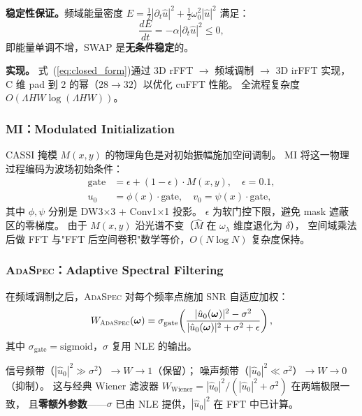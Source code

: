 \documentclass[a4paper,11pt,twocolumn]{ctexart}
\newcommand{\swap}{\textsc{SWAP}}
\newcommand{\mi}{\textsc{MI}}
\newcommand{\adaspec}{\textsc{AdaSpec}}
\newcommand{\nle}{\textsc{NLE}}
\begin{document}
\textbf{稳定性保证。}频域能量密度 $E = \frac{1}{2}|\partial_t\hat{u}|^2 + \frac{1}{2}\omega_0^2|\hat{u}|^2$ 满足：
\begin{equation}
\frac{dE}{dt} = -\alpha |\partial_t \hat{u}|^2 \le 0,
\label{eq:stability}
\end{equation}
即能量单调不增，\swap{} 是\textbf{无条件稳定}的。

\textbf{实现。}
式~(\ref{eq:closed_form})通过 3D rFFT $\to$ 频域调制 $\to$ 3D irFFT 实现，
C 维 pad 到 2 的幂（$28 \to 32$）以优化 cuFFT 性能。
全流程复杂度 $O(\Lambda HW \log(\Lambda HW))$。

\subsubsection{\mi{}：Modulated Initialization}\label{sec:mi}

CASSI 掩模 $M(x,y)$ 的物理角色是对初始振幅施加空间调制。
\mi{} 将这一物理过程编码为波场初始条件：
\begin{equation}
\begin{aligned}
\text{gate} &= \epsilon + (1-\epsilon) \cdot M(x,y), \quad \epsilon = 0.1, \\
u_0 &= \phi(x) \cdot \text{gate}, \quad v_0 = \psi(x) \cdot \text{gate},
\end{aligned}
\label{eq:mi}
\end{equation}
其中 $\phi, \psi$ 分别是 DW3$\times$3 + Conv1$\times$1 投影。
$\epsilon$ 为软门控下限，避免 mask 遮蔽区的零梯度。
由于 $M(x,y)$ 沿光谱不变（$\hat{M}$ 在 $\omega_\lambda$ 维度退化为 $\delta$），
空间域乘法后做 FFT 与"FFT 后空间卷积"数学等价，$O(N\log N)$ 复杂度保持。


\subsubsection{\adaspec{}：Adaptive Spectral Filtering}\label{sec:adaspec}

在频域调制之后，\adaspec{} 对每个频率点施加 SNR 自适应加权：
\begin{equation}
W_{\adaspec{}}(\bm\omega) = \sigma_{\mathrm{gate}}\!\left(\frac{|\hat{u}_0(\bm\omega)|^2 - \sigma^2}{|\hat{u}_0(\bm\omega)|^2 + \sigma^2 + \epsilon}\right),
\label{eq:adaspec}
\end{equation}
其中 $\sigma_{\mathrm{gate}} = \mathrm{sigmoid}$，$\sigma$ 复用 \nle{} 的输出。

信号频带（$|\hat{u}_0|^2 \gg \sigma^2$）$\to W \to 1$（保留）；
噪声频带（$|\hat{u}_0|^2 \ll \sigma^2$）$\to W \to 0$（抑制）。
这与经典 Wiener 滤波器 $W_{\mathrm{Wiener}} = |\hat{u}_0|^2/(|\hat{u}_0|^2 + \sigma^2)$ 在两端极限一致，
且\textbf{零额外参数}——$\sigma$ 已由 \nle{} 提供，$|\hat{u}_0|^2$ 在 FFT 中已计算。
\end{document}
